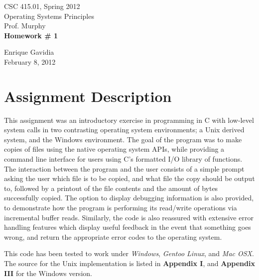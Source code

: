 \documentclass[12pt]{article}
\def \name       {Enrique Gavidia}
\def \coursenum  {CSC 415.01}
\def \coursename {Operating Systems Principles}
\def \instructor {Prof. Murphy}
\def \semester   {Spring 2012}
\def \assignment {Homework \# 1}
\def \duedate    {February 8, 2012}
\begin{document}
\begin{titlepage}
  \begin{center}

    \LARGE{\coursenum, \semester \\ \coursename}\\
    \Large{\instructor}\\

    \vfill
    \textbf{\Huge \assignment}\\
    \vfill
    
    \Large{\name}\\ 
    \large{\duedate}
    
  \end{center}
\end{titlepage}


\section*{Assignment Description}
This assignment was an introductory exercise in programming in C with low-level system calls in two contrasting operating 
system environments; a Unix derived system, and the Windows environment. The goal of the program was to make copies of files 
using the native operating system APIs, while providing a command line interface for users using C's formatted I/O library of
functions.  The interaction between the program and the user consists of a simple prompt asking the user which file is to be copied,
and what file the copy should be output to, followed by a printout of the file contents and the amount of bytes successfully copied.
The option to display debugging information is also provided, to demonstrate how the program is performing its read/write operations
via incremental buffer reads.  Similarly, the code is also reassured with extensive error handling features which display useful feedback
in the event that something goes wrong, and return the appropriate error codes to the operating system.

This code has been tested to work under \textsl{Windows}, \textsl{Gentoo Linux}, and \textsl{Mac OSX}. 
The source for the Unix implementation is listed in \textbf{Appendix I}, and \textbf{Appendix III} for the Windows version.
\end{document}
